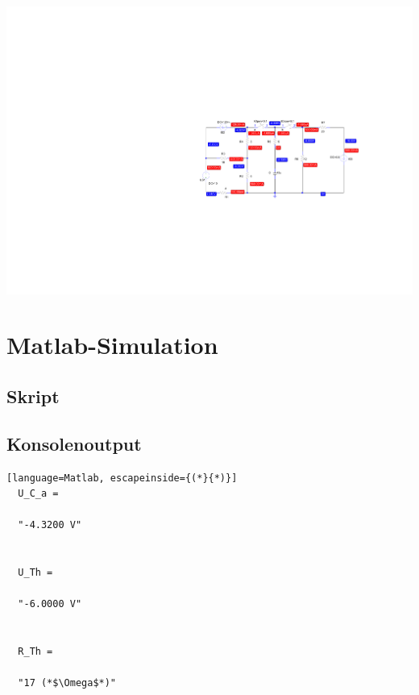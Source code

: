 \documentclass[11pt]{scrartcl}
\begin{document}
\begin{center}
  \includegraphics[scale=1.3]{./Assets/gesamter Schaltvorgang.pdf}
  \label{fig:umschalt}
\end{center}

\newpage
\section{Matlab-Simulation}
\subsection{Skript}


\subsection{Konsolenoutput}
\begin{lstlisting}[language=Matlab, escapeinside={(*}{*)}]
  U_C_a =

  "-4.3200 V"


  U_Th =

  "-6.0000 V"


  R_Th =

  "17 (*$\Omega$*)"
\end{lstlisting}
\end{document}
